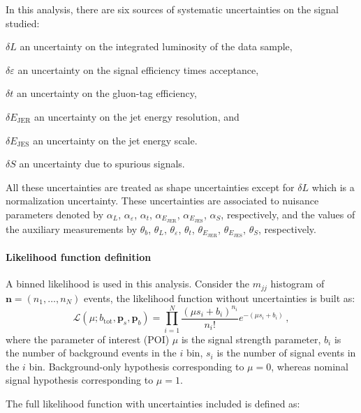 In this analysis, there are six sources of systematic uncertainties on the signal studied: 

\begin{description}
\item $\delta L$ an uncertainty on the integrated luminosity of the data
  sample,
\item $\delta\varepsilon$ an uncertainty on the signal efficiency times
  acceptance, 
\item $\delta t$ an uncertainty on the gluon-tag efficiency,
\item $\delta E_\mathrm{JER}$ an uncertainty on the jet energy
  resolution, and
\item $\delta E_\mathrm{JES}$ an uncertainty on the jet energy scale.
\item $\delta S$ an uncertainty due to spurious signals.
\end{description}

\noindent
All these uncertainties are treated as shape uncertainties except for
$\delta L$ which is a normalization uncertainty.
These uncertainties are associated to nuisance parameters denoted by
$\alpha_L$,
$\alpha_\varepsilon$, $\alpha_t$, $\alpha_{E_\mathrm{JER}}$,
$\alpha_{E_\mathrm{JES}}$, $\alpha_S$, 
respectively, and the values of the auxiliary measurements by 
$\theta_b$, $\theta_L$, $\theta_\varepsilon$, $\theta_t$,
$\theta_{E_\mathrm{JER}}$, $\theta_{E_\mathrm{JES}}$, $\theta_S$, respectively.


\paragraph{Likelihood function definition\\}

A binned likelihood is used in this analysis. Consider the $m_{jj}$ histogram of $\bm{n} = (n_1, \ldots, n_N)$
events, the likelihood function without uncertainties is built as:
\begin{equation}
\mathcal{L}(\mu;b_\mathrm{tot},\bm{p}_s,\bm{p}_b) = \prod_{i=1}^N \frac{(\mu s_i +
b_i)^{n_i}}{n_i!} e^{-(\mu s_i + b_i)}\, ,
\end{equation}
\noindent
where the parameter of interest (POI) $\mu$ is the signal strength
parameter, $b_i$ is the number of background events in the $i$ bin, $s_i$ is the number of signal events in the $i$ bin. Background-only
hypothesis corresponding to $\mu = 0$, whereas nominal signal hypothesis corresponding to $\mu = 1$.

The full likelihood function with uncertainties included is defined as:

